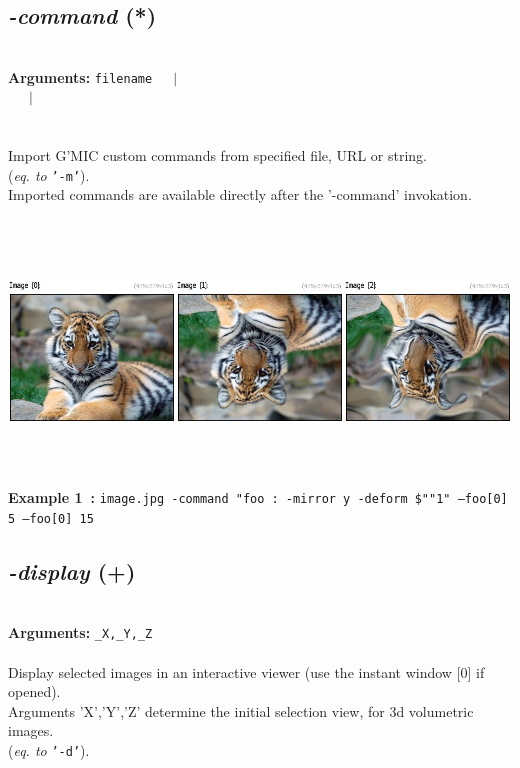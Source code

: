 \documentclass[a4paper,11pt,twoside]{book}
\begin{document}
\subsection{\emph{-command} (*)}\vspace*{-0.5em}
~\\\textbf{Arguments: } 
{\small \texttt{filename}}~~~$|$\\
~~~$|$\\
\\~\\
Import G'MIC custom commands from specified file, URL or string.
~\\(\emph{eq. to} {\small \texttt{'-m'}}).
~\\Imported commands are available directly after the '-command' invokation.
\begin{center}\includegraphics[keepaspectratio=true,height=7cm,width=\textwidth]{img/gmic_def1.jpg}\\
{\footnotesize \textbf{Example 1~:} \texttt{image.jpg -command "foo : -mirror y -deform \$""1" --foo[0] 5 --foo[0] 15}}
\end{center}

\subsection{\emph{-display} (+)}\vspace*{-0.5em}
~\\\textbf{Arguments: } 
{\small \texttt{\_X,\_Y,\_Z}}\\~\\
Display selected images in an interactive viewer (use the instant window [0] if opened).
~\\Arguments 'X','Y','Z' determine the initial selection view, for 3d volumetric images.
~\\(\emph{eq. to} {\small \texttt{'-d'}}).
\end{document}
